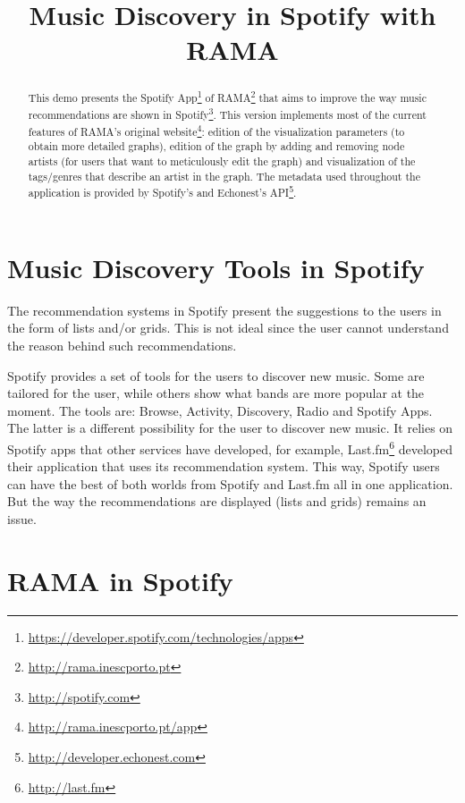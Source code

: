 \documentclass{article}
\title{Music Discovery in Spotify with RAMA}
\begin{document}
%
\maketitle
%
\begin{abstract}
  This demo presents the Spotify App\footnote{\url{https://developer.spotify.com/technologies/apps}} of RAMA\footnote{\url{http://rama.inescporto.pt}} that aims to improve the way music recommendations are shown in Spotify\footnote{\url{http://spotify.com}}.
  This version implements most of the current features of RAMA's original website\footnote{\url{http://rama.inescporto.pt/app}}: edition of the visualization parameters (to obtain more detailed graphs), edition of the graph by adding and removing node artists (for users that want to meticulously edit the graph) and visualization of the tags/genres that describe an artist in the graph.
  The metadata used throughout the application is provided by Spotify's and Echonest's API\footnote{\url{http://developer.echonest.com}}.

\end{abstract}

  \section{Music Discovery Tools in Spotify} %
  \label{sec:spotify_tools}
  
    The recommendation systems in Spotify present the suggestions to the users in the form of lists and/or grids.
    This is not ideal since the user cannot understand the reason behind such recommendations.

    Spotify provides a set of tools for the users to discover new music.
    Some are tailored for the user, while others show what bands are more popular at the moment.
    The tools are: Browse, Activity, Discovery, Radio and Spotify Apps.
    The latter is a different possibility for the user to discover new music.
    It relies on Spotify apps that other services have developed, for example, Last.fm\footnote{\url{http://last.fm}} developed their application that uses its recommendation system. 
    This way, Spotify users can have the best of both worlds from Spotify and Last.fm all in one application.
    But the way the recommendations are displayed (lists and grids) remains an issue.


  \section{RAMA in Spotify} %
  \label{sec:rama}
  
\end{document}
